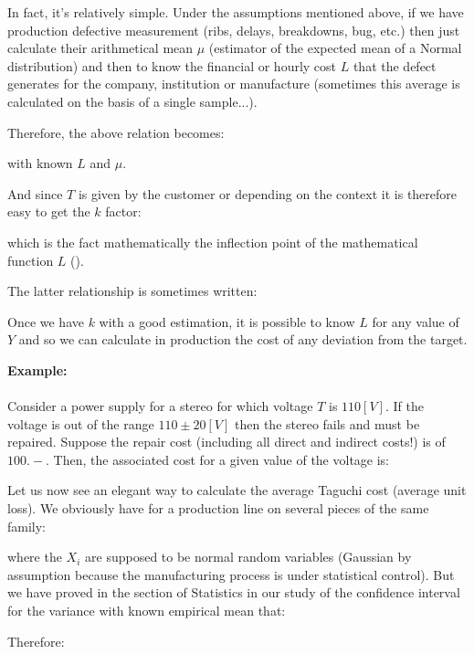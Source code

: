 	In fact, it's relatively simple. Under the assumptions mentioned above, if we have production defective measurement (ribs, delays, breakdowns, bug, etc.) then just calculate their arithmetical mean $\mu$ (estimator of the expected mean of a Normal distribution) and then to know the financial or hourly cost $L$ that the defect generates for the company, institution or manufacture (sometimes this average is calculated on the basis of a single sample...).
	
	Therefore, the above relation becomes:
	
	with known $L$ and $\mu$.
	
	And since $T$ is given by the customer or depending on the context it is therefore easy to get the $k$ factor:
	
	which is the fact mathematically the inflection point of the mathematical function $L$ ().
	
	The latter relationship is sometimes written:
	
	
	Once we have $k$ with a good estimation, it is possible to know $L$ for any value of $Y$ and so we can calculate in production the cost of any deviation from the target.
	
	\begin{tcolorbox}[colframe=black,colback=white,sharp corners]
	\textbf{{\Large {}}Example:}\\\\
	Consider a power supply for a stereo for which voltage $T$ is $110 [V]$. If the voltage is out of the range $110\pm 20 [V]$ then the stereo fails and must be repaired. Suppose the repair cost (including all direct and indirect costs!) is of $100.-$. Then, the associated cost for a given value of the voltage is:
	
	\end{tcolorbox}
	
	Let us now see an elegant way to calculate the average Taguchi cost (average unit loss). We obviously have for a production line on several pieces of the same family:
	
	where the $X_i$ are supposed to be normal random variables (Gaussian by  assumption because the manufacturing process is under statistical control). But we have proved in the section of Statistics in our study of the confidence interval for the variance with known empirical mean that:
	
	Therefore:
	
